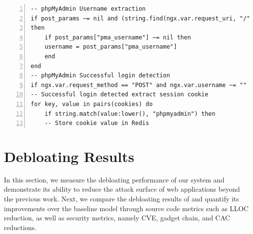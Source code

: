 \begin{lstlisting}[belowskip=-1em, caption=LUA configuration to detect successful logins and extract authentication cookies for phpMyAdmin,label=lst:lua,basicstyle=\footnotesize, language={[5.0]Lua},commentstyle=\color{commentsColor}\textit, numbers=left, xleftmargin=5.0ex, breaklines=true, float=t, floatplacement=t]
-- phpMyAdmin Username extraction
if post_params ~= nil and (string.find(ngx.var.request_uri, "/") or string.find(ngx.var.request_uri, "index.php")) 
then
    if post_params["pma_username"] ~= nil then
    username = post_params["pma_username"]
    end
end
-- phpMyAdmin Successful login detection
if ngx.var.request_method == "POST" and ngx.var.username ~= "" and ngx.status == 302 then
-- Successful login detected extract session cookie
for key, value in pairs(cookies) do
    if string.match(value:lower(), "phpmyadmin") then
    -- Store cookie value in Redis
\end{lstlisting}

\section{Debloating Results}
\label{sec:debloatingresults}

In this section, we measure the debloating performance of our system and demonstrate its ability to reduce the attack surface of web applications beyond the previous work. 
Next, we compare the debloating results of \dbltr{} and quantify its improvements over the baseline model through source code metrics such as LLOC reduction, as well as security metrics, namely CVE, gadget chain, and CAC reductions. 


